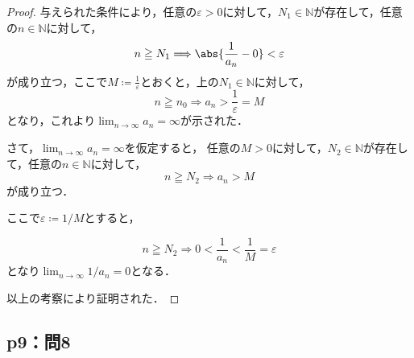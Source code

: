 \documentclass[uplatex,dvipdfmx,a4paper,10pt,fleqn]{jsarticle}
\begin{document}
    \begin{tleftbar}
        \begin{proof}
            与えられた条件により，任意の$\varepsilon>0$に対して，$N_1 \in \mathbb{N}$が存在して，任意の$n \in \mathbb{N}$に対して，
    \[
        n \geqq N_1 \Longrightarrow \abs{\frac{1}{a_n}-0}<\varepsilon
    \]
    が成り立つ，ここで$M \coloneqq \frac{1}{\varepsilon}$とおくと，上の$N_1 \in \mathbb{N}$に対して，
    \[
        n \geqq n_0 \Longrightarrow a_n  >\frac{1}{\varepsilon}=M
    \]
    となり，これより$\lim_{n \to \infty} a_n=\infty$が示された．

    さて，$\lim_{n \to \infty} a_n = \infty$を仮定すると，
        任意の$M>0$に対して，$N_2 \in \mathbb{N}$が存在して，任意の$n \in \mathbb{N}$に対して，
        \[
            n \geqq N_2 \Longrightarrow a_n > M
        \]
        が成り立つ．

        ここで$\varepsilon \coloneqq  1/M$とすると，

        \[
            n \geqq N_2 \Longrightarrow 0< \frac{1}{a_n} < \frac{1}{M}= \varepsilon 
        \]
        となり$\lim_{n \to \infty} 1/a_n = 0$となる．
        
        以上の考察により証明された．
        \end{proof}
        \end{tleftbar}


    \subsection*{p9：問8}
\end{document}
